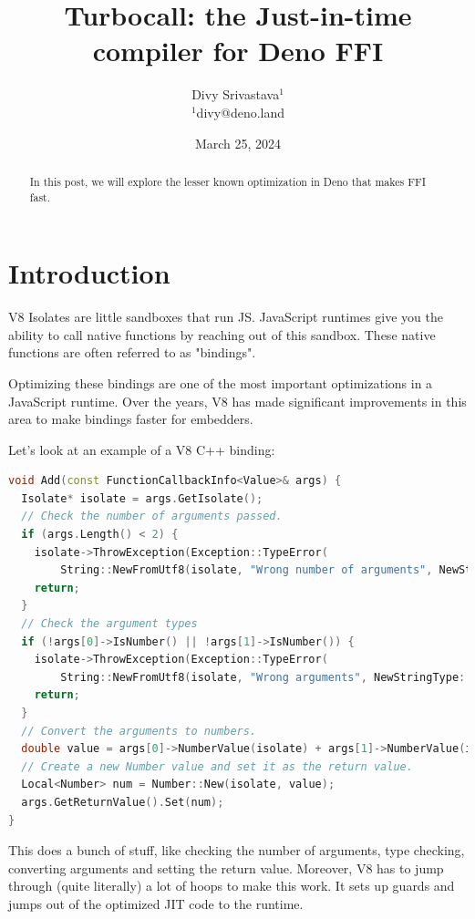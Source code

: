 \documentclass{article}
\title{Turbocall: the Just-in-time compiler for Deno FFI}
\date{March 25, 2024}
\author
{
Divy Srivastava$^{1}$ 
\\
\normalsize{$^{1}$divy@deno.land}
}
\begin{document}
\maketitle

\begin{abstract}
In this post, we will explore the lesser known optimization in Deno that makes FFI fast.
\end{abstract}

\section{Introduction}

V8 Isolates are little sandboxes that run JS.
JavaScript runtimes give you the ability to call native functions by reaching out of this sandbox.
These native functions are often referred to as "bindings".

Optimizing these bindings are one of the most important optimizations in a JavaScript runtime.
Over the years, V8 has made significant improvements in this area to make bindings faster for embedders.

Let's look at an example of a V8 C++ binding:

\begin{lstlisting}[language=C++, caption=example V8 C++ binding]
void Add(const FunctionCallbackInfo<Value>& args) {
  Isolate* isolate = args.GetIsolate();
  // Check the number of arguments passed.
  if (args.Length() < 2) {
    isolate->ThrowException(Exception::TypeError(
        String::NewFromUtf8(isolate, "Wrong number of arguments", NewStringType::kNormal).ToLocalChecked()));
    return;
  }
  // Check the argument types
  if (!args[0]->IsNumber() || !args[1]->IsNumber()) {
    isolate->ThrowException(Exception::TypeError(
        String::NewFromUtf8(isolate, "Wrong arguments", NewStringType::kNormal).ToLocalChecked()));
    return;
  }
  // Convert the arguments to numbers.
  double value = args[0]->NumberValue(isolate) + args[1]->NumberValue(isolate);
  // Create a new Number value and set it as the return value.
  Local<Number> num = Number::New(isolate, value);
  args.GetReturnValue().Set(num);
}
\end{lstlisting}

This does a bunch of stuff, like checking the number of arguments, type checking, converting arguments and setting the return value. Moreover, V8 has to jump through (quite literally) a lot of hoops to make this work.
It sets up guards and jumps out of the optimized JIT code to the runtime.
\end{document}
